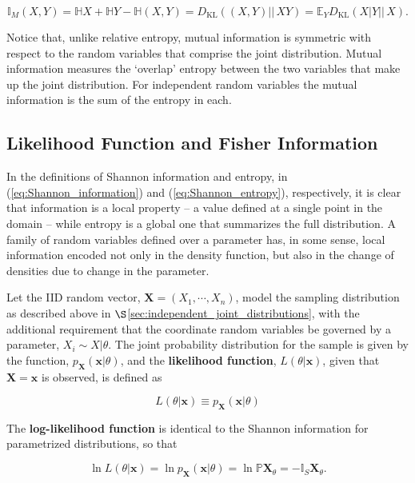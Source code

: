\documentclass[12pt, twoside, draft]{article}
\begin{document}
\begin{equation}
\mathbb{I}_M(X,Y) = \mathbb{H}X + \mathbb{H}Y - \mathbb{H}(X,Y) = D_{\text{KL}}\left( (X,Y) ||\, XY \right) = \mathbb{E}_Y D_{\text{KL}}\left( X|Y ||\, X \right).
\end{equation}

Notice that, unlike relative entropy, mutual information is symmetric with respect to the random variables that comprise the joint distribution.  Mutual information measures the `overlap' entropy between the two variables that make up the joint distribution.  For independent random variables the mutual information is the sum of the entropy in each.

\subsection{Likelihood Function and Fisher Information}\label{sec:likelihood_function_Fisher_information}

In the definitions of Shannon information and entropy, in (\ref{eq:Shannon_information}) and (\ref{eq:Shannon_entropy}), respectively, it is clear that information is a local property -- a value defined at a single point in the domain -- while entropy is a global one that summarizes the full distribution.  A family of random variables defined over a parameter has, in some sense, local information encoded not only in the density function, but also in the change of densities due to change in the parameter.  

Let the IID random vector, $\mathbf{X} = (X_1, \cdots, X_n)$, model the sampling distribution as described above in $\S$\ref{sec:independent_joint_distributions}, with the additional requirement that the coordinate random variables be governed by a parameter, $X_i \sim X | \theta$.  The joint probability distribution for the sample is given by the function, $p_{\mathbf{X}}(\mathbf{x}|\theta)$,  and the \textbf{likelihood function}, $L(\theta | \mathbf{x})$, given that $\mathbf{X} = \mathbf{x}$ is observed, is defined as

\begin{equation}\label{eq:likelihood_definition}
L(\theta | \mathbf{x}) \equiv p_{\mathbf{X}}(\mathbf{x} | \theta)
\end{equation}

The \textbf{log-likelihood function} is identical to the Shannon information for parametrized distributions, so that

\begin{equation}\label{eq:log_likelihood_definition}
\ln L(\theta | \mathbf{x}) = \ln p_{\mathbf{X}}(\mathbf{x} | \theta) = \ln \mathbb{P}\mathbf{X}_{\theta} = -\mathbb{I}_S\mathbf{X}_{\theta}.
\end{equation}
\end{document}

